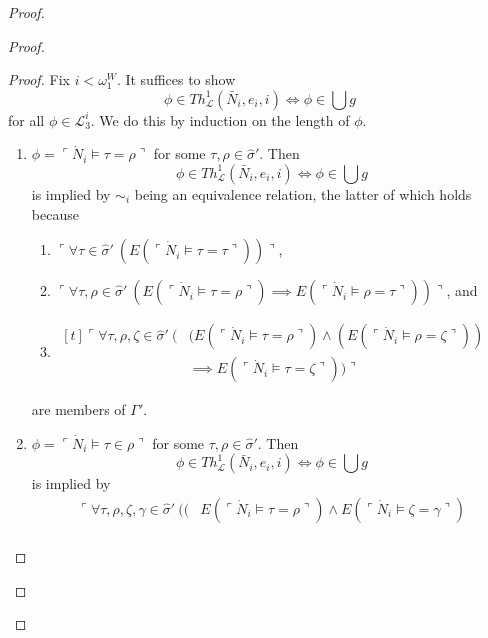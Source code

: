 \documentclass[12pt, twoside]{memoir}
\numberwithin{equation}{section}
\theoremstyle{definition}
\theoremstyle{remark}
\theoremstyle{definition}
\theoremstyle{definition}
\theoremstyle{definition}
\theoremstyle{remark}
\begin{document}
\begin{proof}
\begin{proof}
\begin{proof}
Fix $i < \omega_1^W$. It suffices to show 
\begin{equation*}
    \phi \in Th^{1}_{\mathcal{L}}(\bar{N}_i, e_i, i) \iff \phi \in \bigcup g
\end{equation*}
for all $\phi \in \mathcal{L}^i_3$. We do this by induction on the length of $\phi$. 

\begin{enumerate}[label=Case \arabic*:, leftmargin=50pt]
    \item $\phi = \ulcorner \dot{N}_i \models \tau = \rho \urcorner$ for some $\tau, \rho \in \hat{\sigma}'$. Then 
    \begin{equation*}
        \phi \in Th^{1}_{\mathcal{L}}(\bar{N}_i, e_i, i) \iff \phi \in \bigcup g
    \end{equation*}
    is implied by $\sim_i$ being an equivalence relation, the latter of which holds because 
    \begin{enumerate}[label=(\alph*)]
        \item $\ulcorner \forall \tau \in \hat{\sigma}' \ (E(\ulcorner \dot{N}_i \models \tau = \tau \urcorner)) \urcorner$,
        \item $\ulcorner \forall \tau, \rho \in \hat{\sigma}' \ (E(\ulcorner \dot{N}_i \models \tau = \rho \urcorner) \implies E(\ulcorner \dot{N}_i \models \rho = \tau \urcorner)) \urcorner$, and
        \item 
        \!
        $\begin{aligned}[t]\ulcorner \forall \tau, \rho, \zeta \in \hat{\sigma}' \ (&(E(\ulcorner \dot{N}_i \models \tau = \rho \urcorner) \wedge (E(\ulcorner \dot{N}_i \models \rho = \zeta \urcorner)) \\
        & \implies E(\ulcorner \dot{N}_i \models \tau = \zeta \urcorner)) \urcorner
        \end{aligned}$
    \end{enumerate}
    are members of $\Gamma'$.
    \item $\phi = \ulcorner \dot{N}_i \models \tau \in \rho \urcorner$ for some $\tau, \rho \in \hat{\sigma}'$. Then 
    \begin{equation*}
        \phi \in Th^{1}_{\mathcal{L}}(\bar{N}_i, e_i, i) \iff \phi \in \bigcup g
    \end{equation*}
    is implied by  
    \begin{align*}
        \ulcorner \forall \tau, \rho, \zeta, \gamma \in \hat{\sigma}' \ (( & E(\ulcorner \dot{N}_i \models \tau = \rho \urcorner) \wedge E(\ulcorner \dot{N}_i \models \zeta = \gamma \urcorner) \\

\end{align*}
\end{enumerate}
\end{proof}
\end{proof}
\end{proof}
\end{document}
